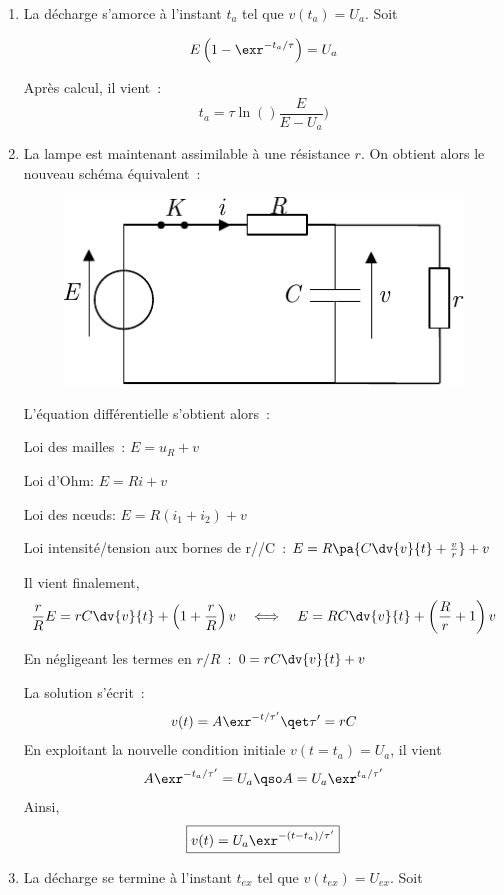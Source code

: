 \documentclass[a4paper, 10pt, garamond, oneside]{book}
\begin{document}
{\begin{enumerate}
		      La solution générale est la somme de la solution homogène et d'une
          solution particulière constante~:

		      \[
			      v(t) = A \exr^{-t/\tau} +E \qet \tau = RC
		      \]
		      $A$ se détermine avec les conditions initiales $v(t=0) = 0$. Ainsi,
		      \[
			      v(0) = A +E = 0 \qdc  A= -E
		      \]
		      Finalement~:
		      \[
			      \boxed{v(t) = E\left(1-\exr^{-t/\tau}\right)}
		      \]
		\item
		      La décharge s'amorce à l'instant $t_{a}$ tel que $v(t_{a}) =
			      U_{a}$. Soit

		      \[
			      E\left(1-\exr^{-t_{a}/\tau}\right) = U_{a}
		      \]

		      Après calcul, il vient~:
		      \[
			      \boxed{t_{a} = \tau \ln()\frac{E}{E-U_{a}})}
		      \]
		\item
		      La lampe est maintenant assimilable à une résistance $r$. On obtient
		      alors le nouveau schéma équivalent~:

		      \begin{figure}[htbp]
			      \centering
			      \includegraphics[width=.5\linewidth]{balise_2}
		      \end{figure}

		      L'équation différentielle s'obtient alors~:

		      Loi des mailles~: $E = u_{R}+v$

		      Loi d'Ohm: $E=Ri+v$

		      Loi des nœuds: $E = R(i_1+i_2)+v$

		      Loi intensité/tension aux bornes de r//C~:
		      $E = R\pa{C\dv{v}{t}+ \frac{v}{r}}+v$

		      Il vient finalement,
		      \[
			      \frac{r}{R}E = rC\dv{v}{t}+ \left(1+\frac{r}{R}\right)v
			      \quad \Longleftrightarrow \quad
			      E = RC \dv{v}{t} + \left(\frac{R}{r}+1\right) v
		      \]

		      En négligeant les termes en $r/R$~: $0 = rC \dv{v}{t}+ v$

		      La solution s'écrit~:
		      \[
			      v(t) = A \exr^{-t/\tau'} \qet \tau' = rC
		      \]
		      En exploitant la nouvelle condition initiale
		      $v(t=t_{a}) = U_{a}$, il vient
		      \[
			      A\exr^{-t_{a}/\tau'} =
			      U_{a} \qso  A =
			      U_{a}\exr^{t_{a}/\tau'}
		      \]
		      Ainsi,
		      \[
			      \boxed{v(t) = U_{a} \exr^{-(t-t_{a})/\tau'}}
		      \]
		\item
		      La décharge se termine à l'instant $t_{ex}$ tel que
		      $v(t_{ex}) = U_{ex}$. Soit


\end{enumerate}}
\end{document}
